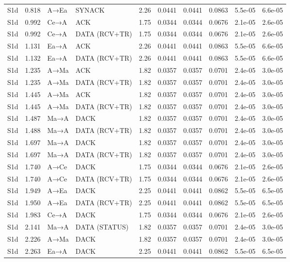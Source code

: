 \documentclass[10pt,letterpaper]{article}
\begin{document}
{\begin{longtable}{@{}lrllrrrrrr@{}}
S1d & 0.818 & A→Ea & SYNACK & 2.26 & 0.0441 & 0.0441 & 0.0863 & 5.5e-05 & 6.6e-05 \\
S1d & 0.992 & Ce→A & ACK & 1.75 & 0.0344 & 0.0344 & 0.0676 & 2.1e-05 & 2.6e-05 \\
S1d & 0.992 & Ce→A & DATA (RCV+TR) & 1.75 & 0.0344 & 0.0344 & 0.0676 & 2.1e-05 & 2.6e-05 \\
S1d & 1.131 & Ea→A & ACK & 2.26 & 0.0441 & 0.0441 & 0.0863 & 5.5e-05 & 6.6e-05 \\
S1d & 1.132 & Ea→A & DATA (RCV+TR) & 2.26 & 0.0441 & 0.0441 & 0.0863 & 5.5e-05 & 6.6e-05 \\
S1d & 1.235 & A→Ma & ACK & 1.82 & 0.0357 & 0.0357 & 0.0701 & 2.4e-05 & 3.0e-05 \\
S1d & 1.235 & A→Ma & DATA (RCV+TR) & 1.82 & 0.0357 & 0.0357 & 0.0701 & 2.4e-05 & 3.0e-05 \\
S1d & 1.445 & A→Ma & ACK & 1.82 & 0.0357 & 0.0357 & 0.0701 & 2.4e-05 & 3.0e-05 \\
S1d & 1.445 & A→Ma & DATA (RCV+TR) & 1.82 & 0.0357 & 0.0357 & 0.0701 & 2.4e-05 & 3.0e-05 \\
S1d & 1.487 & Ma→A & DACK & 1.82 & 0.0357 & 0.0357 & 0.0701 & 2.4e-05 & 3.0e-05 \\
S1d & 1.488 & Ma→A & DATA (RCV+TR) & 1.82 & 0.0357 & 0.0357 & 0.0701 & 2.4e-05 & 3.0e-05 \\
S1d & 1.697 & Ma→A & DACK & 1.82 & 0.0357 & 0.0357 & 0.0701 & 2.4e-05 & 3.0e-05 \\
S1d & 1.697 & Ma→A & DATA (RCV+TR) & 1.82 & 0.0357 & 0.0357 & 0.0701 & 2.4e-05 & 3.0e-05 \\
S1d & 1.740 & A→Ce & DACK & 1.75 & 0.0344 & 0.0344 & 0.0676 & 2.1e-05 & 2.6e-05 \\
S1d & 1.740 & A→Ce & DATA (RCV+TR) & 1.75 & 0.0344 & 0.0344 & 0.0676 & 2.1e-05 & 2.6e-05 \\
S1d & 1.949 & A→Ea & DACK & 2.25 & 0.0441 & 0.0441 & 0.0862 & 5.5e-05 & 6.5e-05 \\
S1d & 1.950 & A→Ea & DATA (RCV+TR) & 2.25 & 0.0441 & 0.0441 & 0.0862 & 5.5e-05 & 6.5e-05 \\
S1d & 1.983 & Ce→A & DACK & 1.75 & 0.0344 & 0.0344 & 0.0676 & 2.1e-05 & 2.6e-05 \\
S1d & 2.141 & Ma→A & DATA (STATUS) & 1.82 & 0.0357 & 0.0357 & 0.0701 & 2.4e-05 & 3.0e-05 \\
S1d & 2.226 & A→Ma & DACK & 1.82 & 0.0357 & 0.0357 & 0.0701 & 2.4e-05 & 3.0e-05 \\
S1d & 2.263 & Ea→A & DACK & 2.25 & 0.0441 & 0.0441 & 0.0862 & 5.5e-05 & 6.5e-05 \\

\end{longtable}}
\end{document}
